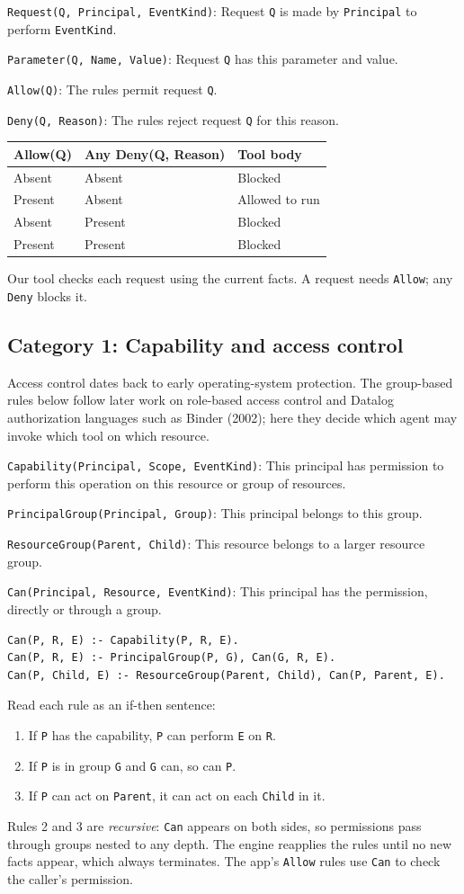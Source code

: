 \documentclass[11pt,letter]{article}
\newcommand{\pred}[2]{\texttt{#1}: #2\par}
\begin{document}
\pred{Request(Q, Principal, EventKind)}{Request \texttt{Q} is made by
\texttt{Principal} to perform \texttt{EventKind}.}
\pred{Parameter(Q, Name, Value)}{Request \texttt{Q} has this parameter and value.}
\pred{Allow(Q)}{The rules permit request \texttt{Q}.}
\pred{Deny(Q, Reason)}{The rules reject request \texttt{Q} for this reason.}
\begin{center}
\begin{tabular}{lll}
\textbf{Allow(Q)} & \textbf{Any Deny(Q, Reason)} & \textbf{Tool body} \\
\hline
Absent & Absent & Blocked \\
Present & Absent & Allowed to run \\
Absent & Present & Blocked \\
Present & Present & Blocked
\end{tabular}
\end{center}
Our tool checks each request using the current facts. A request needs
\texttt{Allow}; any \texttt{Deny} blocks it.


\subsection*{Category 1: Capability and access control}
Access control dates back to early operating-system protection. The
group-based rules below follow later work on role-based access control and
Datalog authorization languages such as Binder (2002); here they decide which
agent may invoke which tool on which resource.

\pred{Capability(Principal, Scope, EventKind)}{This principal has permission
to perform this operation on this resource or group of resources.}
\pred{PrincipalGroup(Principal, Group)}{This principal belongs to this group.}
\pred{ResourceGroup(Parent, Child)}{This resource belongs to a larger resource group.}
\pred{Can(Principal, Resource, EventKind)}{This principal has the permission,
directly or through a group.}

\begin{lstlisting}
Can(P, R, E) :- Capability(P, R, E).
Can(P, R, E) :- PrincipalGroup(P, G), Can(G, R, E).
Can(P, Child, E) :- ResourceGroup(Parent, Child), Can(P, Parent, E).
\end{lstlisting}
Read each rule as an if-then sentence:
\begin{enumerate}
\item If \texttt{P} has the capability, \texttt{P} can perform \texttt{E} on \texttt{R}.
\item If \texttt{P} is in group \texttt{G} and \texttt{G} can, so can \texttt{P}.
\item If \texttt{P} can act on \texttt{Parent}, it can act on each \texttt{Child} in it.
\end{enumerate}
Rules 2 and 3 are \emph{recursive}: \texttt{Can} appears on both sides, so
permissions pass through groups nested to any depth. The engine reapplies the
rules until no new facts appear, which always terminates. The app's
\texttt{Allow} rules use \texttt{Can} to check the caller's permission.
\end{document}
